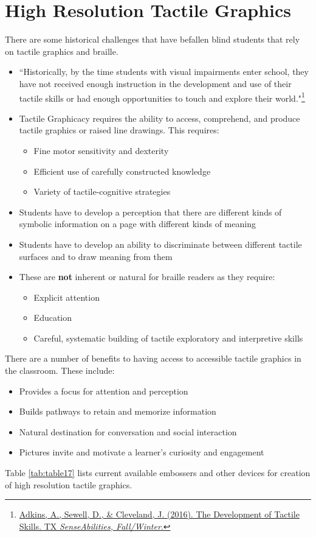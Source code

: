 \pagebreak
\hypertarget{tactile-graphics-high-resolution-complex-graphics}{}\section{High Resolution Tactile Graphics}\label{tactile-graphics-high-resolution-complex-graphics}
There are some historical challenges that have befallen blind students that rely on tactile graphics and braille.
\begin{itemize}[leftmargin=*]
	\item ``Historically, by the time students with visual impairments enter school, they have not received enough instruction in the development and use of their tactile skills or had enough opportunities to touch and explore their world."\footnote{\raggedright \href{http://www.tsbvi.edu/tx-senseabilities/issues/fall-winter-2016/the-development-of-tactile-skills}{Adkins, A., Sewell, D., \& Cleveland, J. (2016). The Development of Tactile Skills. TX \textit{SenseAbilities, Fall/Winter}.}}
	\item Tactile Graphicacy requires the ability to access, comprehend, and produce tactile graphics or raised line drawings. This requires:\begin{itemize}
	\item Fine motor sensitivity and dexterity
	\item Efficient use of carefully constructed knowledge
	\item Variety of tactile-cognitive strategies
\end{itemize}
\item Students have to develop a perception that there are different kinds of symbolic information on a page with different kinds of meaning
\item Students have to develop an ability to discriminate between different tactile surfaces and to draw meaning from them
\item These are \textbf{not} inherent or natural for braille readers as they require:
\begin{itemize}
	\item Explicit attention
	\item Education
	\item Careful, systematic building of tactile exploratory and interpretive skills
\end{itemize}

\end{itemize}

There are a number of benefits to having access to accessible tactile graphics in the classroom. These include:
\begin{itemize}[leftmargin=*]
	\item Provides a focus for attention and perception
	\item Builds pathways to retain and memorize information
	\item Natural destination for conversation and social interaction
	\item Pictures invite and motivate a learner's curiosity and engagement
\end{itemize}
Table \ref{tab:table17} lists current available embossers and other devices for creation of high resolution tactile graphics.


